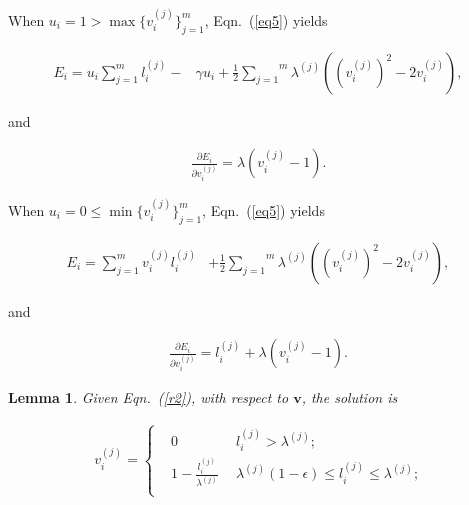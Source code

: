 \documentclass[journal]{IEEEtran}
\newtheorem{lem}{Lemma}[section]
\begin{document}
{{	When $u_i=1>\max\{v_i^{(j)}\}^m_{j=1}$, Eqn.~(\ref{eq5}) yields
	\begin{small}
		\begin{equation}
		\begin{aligned}
		E_i = u_i\sum_{j=1}^{m}l_i^{(j)} -&\gamma u_i + \frac{1}{2} \overset{m}{\underset{j=1}{\sum}}\lambda^{(j)}((v_i^{(j)})^2-2v_i^{(j)}),
		\end{aligned}~\label{r1}
		\end{equation}
	\end{small}and 
	\begin{small}
		\begin{equation}
		\begin{aligned}
		\frac{\partial E_i}{\partial v^{(j)}_i} = \lambda(v^{(j)}_i-1).
		\end{aligned}~\label{d1}
		\end{equation}
	\end{small}
	When $u_i=0\leq\min\{v_i^{(j)}\}^m_{j=1}$, Eqn.~(\ref{eq5}) yields
	\begin{small}
		\begin{equation}
		\begin{aligned}
		E_i = \sum_{j=1}^{m}v_i^{(j)}l_i^{(j)}& + \frac{1}{2} \overset{m}{\underset{j=1}{\sum}}\lambda^{(j)}((v_i^{(j)})^2-2v_i^{(j)}),
		\end{aligned}~\label{r2}
		\end{equation}
	\end{small}and
	\begin{small}
		\begin{equation}
		\begin{aligned}
		\frac{\partial E_i}{\partial v^{(j)}_i} = l^{(j)}_i+\lambda(v^{(j)}_i-1).
		\end{aligned}~\label{d2}
		\end{equation}
	\end{small}	
	\begin{lem}
		Given Eqn.~(\ref{r2}), with respect to $\mathbf{v}$, the solution is		
		\begin{small}
			\begin{equation}
			\begin{gathered}
			v_i^{(j)} 
			=\left\{
			\begin{aligned}	
			&0 &l^{(j)}_i>\lambda^{(j)}; \\
			&1-\frac{l^{(j)}_i}{\lambda^{(j)}}\ \  &\lambda^{(j)}(1-\epsilon)\leq l^{(j)}_i\leq\lambda^{(j)}; \\

\end{aligned}
\end{gathered}
\end{equation}
\end{small}
\end{lem}}}
\end{document}
